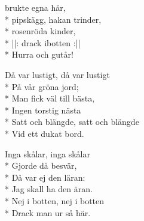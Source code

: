 \begin{SongText}
\begin{SongVerse}
brukte egna hår,\\*%
pipskägg, hakan trinder,\\*%
rosenröda kinder,\\*%
||: drack ibotten :||\\*%
Hurra och gutår!
\end{SongVerse}
\begin{SongVerse}
Då var lustigt, då var lustigt\\*%
På vår gröna jord;\\*%
Man fick väl till bästa,\\*%
Ingen torstig nästa\\*%
Satt och blängde, satt och blängde\\*%
Vid ett dukat bord.
\end{SongVerse}
\begin{SongVerse}
Inga skålar, inga skålar\\*%
Gjorde då besvär,\\*%
Då var ej den läran:\\*%
Jag skall ha den äran.\\*%
Nej i botten, nej i botten\\*%
Drack man ur så här. 
\end{SongVerse}
\end{SongText}
